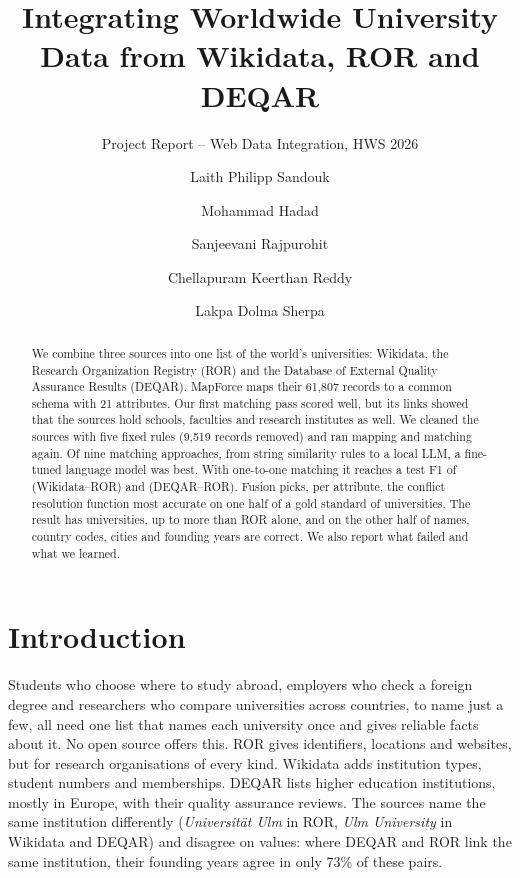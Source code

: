 \documentclass[runningheads,a4paper]{llncs}
\begin{document}
\title{Integrating Worldwide University Data from Wikidata, ROR and DEQAR}
\subtitle{Project Report -- Web Data Integration, HWS 2026}
\titlerunning{\mbox{}}%

\author{Laith Philipp Sandouk \and Mohammad Hadad \and Sanjeevani Rajpurohit \and Chellapuram Keerthan Reddy
\and Lakpa Dolma Sherpa}
\authorrunning{\mbox{}}%

\maketitle

\begin{abstract}
We combine three sources into one list of the world's universities: Wikidata, the Research Organization
Registry (ROR) and the Database of External Quality Assurance Results (DEQAR). MapForce maps their 61,807 records to
a common schema with 21 attributes. Our first matching pass scored well, but its links showed that the
sources hold schools, faculties and research institutes as well. We cleaned the sources with five fixed
rules (9,519 records removed) and ran mapping and matching again. Of nine matching approaches, from string
similarity rules to a local LLM, a fine-tuned language model was best. With one-to-one matching it reaches a
test F1 of \wrTestF{} (Wikidata--ROR) and \drTestF{} (DEQAR--ROR). Fusion picks, per attribute, the
conflict resolution function most accurate on one half of a gold standard of \goldTotal{}
universities. The result has \nFused{} universities, up to \pctAdded{} more than ROR alone, and on the other half
\accFinal{} of names, country codes, cities and founding years are correct.
We also report what failed and what we learned.
\end{abstract}

\section{Introduction}

Students who choose where to study abroad, employers who check a foreign degree and researchers who compare
universities across countries, to name just a few, all need one list that names each university once and gives reliable facts
about it. No open source offers this. ROR gives identifiers, locations and websites, but for research
organisations of every kind. Wikidata adds institution types, student numbers and memberships. DEQAR lists
higher education institutions, mostly in Europe, with their quality assurance reviews. The sources name the
same institution differently (\emph{Universit\"at Ulm} in ROR, \emph{Ulm University} in Wikidata and DEQAR)
and disagree on values: where DEQAR and ROR link the same institution, their founding years agree in only
73\% of these pairs.
\end{document}
